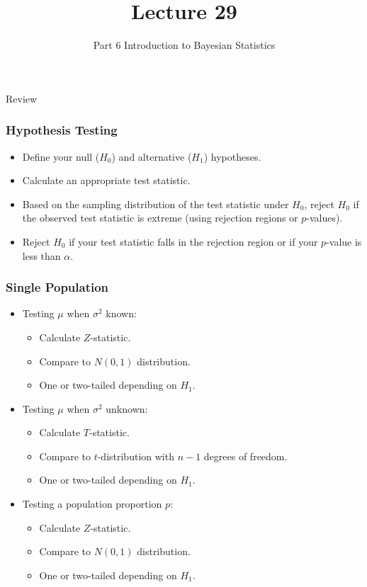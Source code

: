 \documentclass[12pt]{beamer}
\title[ECON2843]{Lecture 29}
\subtitle{Part 6 Introduction to Bayesian Statistics}
\date{}
\begin{document}
	\begin{frame}
		\titlepage
		
	\end{frame}
	\begin{frame}
		\vspace{1cm}
		\centering
		{\color{blue}\large Review}
	\end{frame}
\begin{frame}
	\frametitle{Hypothesis Testing}
	
	\begin{itemize}[label={\color{blue}$\blacktriangleright$}]
		\item Define your null ($H_0$) and alternative ($H_1$) hypotheses.
		
		\item Calculate an appropriate test statistic.
		
		\item Based on the sampling distribution of the test statistic under $H_0$, reject $H_0$ if the observed test statistic is extreme (using rejection regions or $p$-values).
		
		\item Reject $H_0$ if your test statistic falls in the rejection region or if your $p$-value is less than $\alpha$.
	\end{itemize}
	
\end{frame}
\begin{frame}
	\frametitle{Single Population}
	
	\begin{itemize}[label={\color{blue}$\blacktriangleright$}]
		\item Testing $\mu$ when $\sigma^2$ known:
		\begin{itemize}[label={\color{blue}$\blacktriangleright$}]
			\item Calculate $Z$-statistic.
			\item Compare to $N(0,1)$ distribution.
			\item One or two-tailed depending on $H_1$.
		\end{itemize}
		
		\item Testing $\mu$ when $\sigma^2$ unknown:
		\begin{itemize}[label={\color{blue}$\blacktriangleright$}]
			\item Calculate $T$-statistic.
			\item Compare to $t$-distribution with $n-1$ degrees of freedom.
			\item One or two-tailed depending on $H_1$.
		\end{itemize}
		
		\item Testing a population proportion $p$:
		\begin{itemize}[label={\color{blue}$\blacktriangleright$}]
			\item Calculate $Z$-statistic.
			\item Compare to $N(0,1)$ distribution.
			\item One or two-tailed depending on $H_1$.
		\end{itemize}
	\end{itemize}
	
\end{frame}
\end{document}
